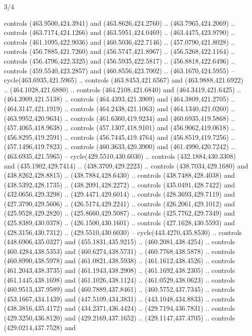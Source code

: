 \begin{flagdescription}{3/4}
\begin{scope}[xshift=0.5\flaglength]
\begin{scope}[scale=0.002\flagwidth,yshift=146.5mm,xshift=-52mm]
\begin{scope}[y=0.80pt, x=0.80pt, yscale=-1, xscale=1, inner sep=0pt, outer sep=0pt]
\begin{scope}[cm={{1.03426,0.0,0.0,1.03426,(-229.44745,-87.97837)}}]
\begin{scope}[fill=black]
  controls (463.9500,424.3941) and (463.8626,424.2760) .. (463.7965,424.2069) ..
  controls (463.7174,424.1266) and (463.5951,424.0469) .. (463.4475,423.9790) ..
  controls (461.1095,422.9036) and (460.5036,422.7146) .. (457.0790,421.8028) ..
  controls (456.7885,421.7260) and (456.5747,421.8967) .. (456.5268,422.1164) ..
  controls (456.4796,422.3325) and (456.5935,422.5817) .. (456.8818,422.6496) ..
  controls (459.5540,423.2857) and (460.8556,423.7002) .. (463.1670,424.5955) --
  cycle(463.6935,421.5965) .. controls (463.8453,421.6567) and
  (463.9888,421.6922) .. (464.1028,421.6880) .. controls (464.2108,421.6840) and
  (464.3419,421.6425) .. (464.3909,421.5138) .. controls (464.4393,421.3909) and
  (464.3809,421.2705) .. (464.3147,421.1919) .. controls (464.2438,421.1063) and
  (464.1340,421.0260) .. (463.9952,420.9634) .. controls (461.6360,419.9234) and
  (460.6935,419.5868) .. (457.4065,418.9638) .. controls (457.1307,418.9101) and
  (456.9062,419.0618) .. (456.8295,419.2591) .. controls (456.7445,419.4764) and
  (456.8519,419.7256) .. (457.1496,419.7823) .. controls (460.3633,420.3900) and
  (461.4990,420.7242) .. (463.6935,421.5965) -- cycle(429.5510,430.6030) ..
  controls (432.1884,430.3308) and (435.1902,429.7414) .. (438.3709,429.2223) ..
  controls (438.7034,429.1680) and (438.8262,428.8815) .. (438.7884,428.6430) ..
  controls (438.7488,428.4038) and (438.5392,428.1735) .. (438.2091,428.2272) ..
  controls (435.0491,428.7422) and (432.0656,429.3298) .. (429.4471,429.6014) ..
  controls (428.3693,429.7119) and (427.3790,429.5606) .. (426.5174,429.2241) ..
  controls (426.2061,429.1012) and (425.9528,429.2820) .. (425.8660,429.5087) ..
  controls (425.7762,429.7349) and (425.8389,430.0378) .. (426.1500,430.1601) ..
  controls (427.1628,430.5593) and (428.3156,430.7312) .. (429.5510,430.6030) --
  cycle(443.4270,435.8530) .. controls (448.6906,435.0327) and
  (455.1831,435.9215) .. (460.2081,438.4254) .. controls (460.4284,438.5353) and
  (460.6274,438.5731) .. (460.7768,438.5878) .. controls (460.8990,438.5978) and
  (461.0821,438.5938) .. (461.1612,438.4526) .. controls (461.2043,438.3735) and
  (461.1943,438.2908) .. (461.1692,438.2305) .. controls (461.1445,438.1698) and
  (461.1026,438.1124) .. (461.0529,438.0623) .. controls (460.9513,437.9589) and
  (460.7889,437.8461) .. (460.5752,437.7345) .. controls (453.1667,434.1439) and
  (447.5109,434.3831) .. (443.1048,434.8833) .. controls (438.3816,435.4172) and
  (434.2371,436.4424) .. (429.7194,436.7831) .. controls (429.3250,436.8120) and
  (429.2169,437.1652) .. (429.1147,437.4705) .. controls (429.0214,437.7528) and

\end{scope}
\end{scope}
\end{scope}
\end{scope}
\end{scope}
\end{flagdescription}
